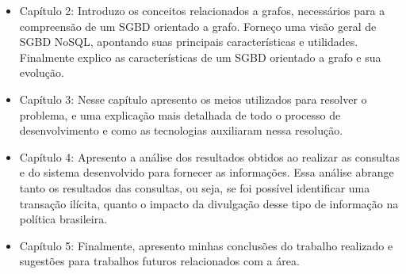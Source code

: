 	\begin{itemize}
		\item Capítulo 2: Introduzo os conceitos relacionados a grafos, necessários para a compreensão de um SGBD orientado a grafo. Forneço uma visão geral de SGBD NoSQL, apontando suas principais características e utilidades. Finalmente explico as características de um SGBD orientado a grafo e sua evolução.
		\item Capítulo 3: Nesse capítulo apresento os meios utilizados para resolver o problema, e uma explicação mais detalhada de todo o processo de desenvolvimento e como as tecnologias auxiliaram nessa resolução.
		\item Capítulo 4: Apresento a análise dos resultados obtidos ao realizar as consultas e do sistema desenvolvido para fornecer as informações. Essa análise abrange tanto os resultados das consultas, ou seja, se foi possível identificar uma transação ilícita, quanto o impacto da divulgação desse tipo de informação na política brasileira.
		\item Capítulo 5: Finalmente, apresento minhas conclusões do trabalho realizado e sugestões para trabalhos futuros relacionados com a área.
	\end{itemize}